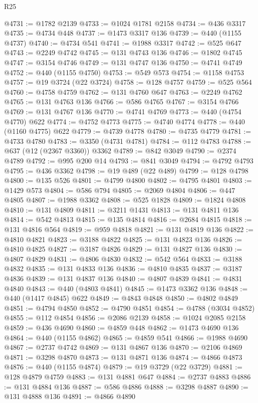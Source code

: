 \begin{lexlean}{R25}
\begin{coremodule}
{{{{{{{{{{{{{{{{{{{{{{{{{{{{{{{{{{{{{{{{{{{{{{{{{{{{{{{{{{{{{{{{{{{{{{{{{{{{{{{{{{{{{{{{{{{{{{{{{{{{{{{{{{{{{{{{{{{{{{{{{{{{{{{{{{{{{{{{{{{{{{{{{{{{{{{{{{{{{{{{{{{{{{{{{{{{{{{{{{{{{{{{{{{{{{{{{{{{{{{@4731 := @1782 @2139
@4733 := @1024 @1781 @2158
@4734 := @436 @3317
@4735 := @4734 @448
@4737 := @1473 @3317 @136
@4739 := @440 (@1155 @4737)
@4740 := @4734 @541
@4741 := @1988 @3317
@4742 := @525 @647
@4743 := @2249 @4742
@4745 := @131 @4743 @136
@4746 := @1802 @4745
@4747 := @3154 @4746
@4749 := @131 @4747 @136
@4750 := @4741 @4749
@4752 := @440 (@1155 @4750)
@4753 := @549 @573
@4754 := @1158 @4753
@4757 := @19 @3724 (@22 @3724)
@4758 := @128 @4757
@4759 := @525 @564
@4760 := @4758 @4759
@4762 := @131 @4760 @647
@4763 := @2249 @4762
@4765 := @131 @4763 @136
@4766 := @586 @4765
@4767 := @3154 @4766
@4769 := @131 @4767 @136
@4770 := @4741 @4769
@4773 := @440 (@4754 @4770) @622
@4774 := @4752 @4773
@4775 := @4740 @4774
@4778 := @440 (@1160 @4775) @622
@4779 := @4739 @4778
@4780 := @4735 @4779
@4781 := @4733 @4780
@4783 := @3350 (@4731 @4781)
@4784 := @112 @4783
@4788 := @637 (@12 (@2367 @3360)) @3362
@4789 := @842 @3049
@4790 := @2374 @4789
@4792 := @995 @200 @14
@4793 := @841 @3049
@4794 := @4792 @4793
@4795 := @436 @3362
@4798 := @19 @489 (@22 @489)
@4799 := @128 @4798
@4800 := @135 @526
@4801 := @4799 @4800
@4802 := @4795 @4801
@4803 := @1429 @573
@4804 := @586 @794
@4805 := @2069 @4804
@4806 := @447 @4805
@4807 := @1988 @3362
@4808 := @525 @1828
@4809 := @1824 @4808
@4810 := @131 @4809
@4811 := @3211 @1431
@4813 := @131 @4811 @136
@4814 := @542 @4813
@4815 := @135 @4814
@4816 := @2684 @4815
@4818 := @131 @4816 @564
@4819 := @959 @4818
@4821 := @131 @4819 @136
@4822 := @4810 @4821
@4823 := @3188 @4822
@4825 := @131 @4823 @136
@4826 := @4810 @4825
@4827 := @3187 @4826
@4829 := @131 @4827 @136
@4830 := @4807 @4829
@4831 := @4806 @4830
@4832 := @542 @564
@4833 := @3188 @4832
@4835 := @131 @4833 @136
@4836 := @4810 @4835
@4837 := @3187 @4836
@4839 := @131 @4837 @136
@4840 := @4807 @4839
@4841 := @4831 @4840
@4843 := @440 (@4803 @4841)
@4845 := @1473 @3362 @136
@4848 := @440 (@1417 @4845) @622
@4849 := @4843 @4848
@4850 := @4802 @4849
@4851 := @4794 @4850
@4852 := @4790 @4851
@4854 := @4788 (@3034 @4852)
@4855 := @112 @4854
@4856 := @2086 @2139
@4858 := @1024 @2085 @2158
@4859 := @436 @4690
@4860 := @4859 @448
@4862 := @1473 @4690 @136
@4864 := @440 (@1155 @4862)
@4865 := @4859 @541
@4866 := @1988 @4690
@4867 := @2737 @4742
@4869 := @131 @4867 @136
@4870 := @2106 @4869
@4871 := @3298 @4870
@4873 := @131 @4871 @136
@4874 := @4866 @4873
@4876 := @440 (@1155 @4874)
@4879 := @19 @3729 (@22 @3729)
@4881 := @128 @4879 @4759
@4883 := @131 @4881 @647
@4884 := @2737 @4883
@4886 := @131 @4884 @136
@4887 := @586 @4886
@4888 := @3298 @4887
@4890 := @131 @4888 @136
@4891 := @4866 @4890
}}}}}}}}}}}}}}}}}}}}}}}}}}}}}}}}}}}}}}}}}}}}}}}}}}}}}}}}}}}}}}}}}}}}}}}}}}}}}}}}}}}}}}}}}}}}}}}}}}}}}}}}}}}}}}}}}}}}}}}}}}}}}}}}}}}}}}}}}}}}}}}}}}}}}}}}}}}}}}}}}}}}}}}}}}}}}}}}}}}}}}}}}}}}}}}}}}}}}}}
\end{coremodule}
\end{lexlean}
